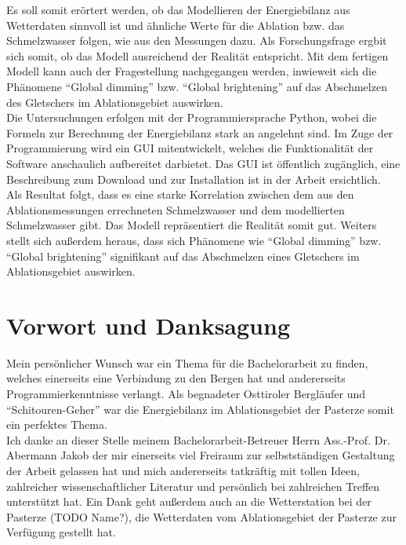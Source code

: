\documentclass[11pt,a4paper]{article}
\begin{document}
Es soll somit erörtert werden, ob das Modellieren der Energiebilanz aus Wetterdaten sinnvoll ist und ähnliche Werte für die Ablation bzw. das Schmelzwasser folgen, wie aus den Messungen dazu. Als Forschungsfrage ergbit sich somit, ob das Modell ausreichend der Realität entspricht. Mit dem fertigen Modell kann auch der Fragestellung nachgegangen werden, inwieweit sich die Phänomene ``Global dimming'' bzw. ``Global brightening'' auf das Abschmelzen des Gletschers im Ablationsgebiet auswirken.\\

Die Untersuchungen erfolgen mit der Programmiersprache Python, wobei die Formeln zur Berechnung der Energiebilanz stark an \cite[153-157]{ThePhysicsOfGlaciers} angelehnt sind. Im Zuge der Programmierung wird ein GUI mitentwickelt, welches die Funktionalität der Software anschaulich aufbereitet darbietet. Das GUI ist öffentlich zugänglich, eine Beschreibung zum Download und zur Installation ist in der Arbeit ersichtlich.\\

Als Resultat folgt, dass es eine starke Korrelation zwischen dem aus den Ablationsmessungen errechneten Schmelzwasser und dem modellierten Schmelzwasser gibt. Das Modell repräsentiert die Realität somit gut. Weiters stellt sich außerdem heraus, dass sich Phänomene wie ``Global dimming'' bzw. ``Global brightening'' signifikant auf das Abschmelzen eines Gletschers im Ablationsgebiet auswirken.\\


\pagebreak
\section*{Vorwort und Danksagung}
Mein persönlicher Wunsch war ein Thema für die Bachelorarbeit zu finden, welches einerseits eine Verbindung zu den Bergen hat und andererseits Programmierkenntnisse verlangt. Als begnadeter Osttiroler Bergläufer und ``Schitouren-Geher'' war die Energiebilanz im Ablationsgebiet der Pasterze somit ein perfektes Thema.\\

Ich danke an dieser Stelle meinem Bachelorarbeit-Betreuer Herrn Ass.-Prof. Dr. Abermann Jakob der mir einerseits viel Freiraum zur selbstständigen Gestaltung der Arbeit gelassen hat und mich andererseits tatkräftig mit tollen Ideen, zahlreicher wissenschaftlicher Literatur und persönlich bei zahlreichen Treffen unterstützt hat. Ein Dank geht außerdem auch an die Wetterstation bei der Pasterze (TODO Name?), die Wetterdaten vom Ablationsgebiet der Pasterze zur Verfügung gestellt hat.
\end{document}
